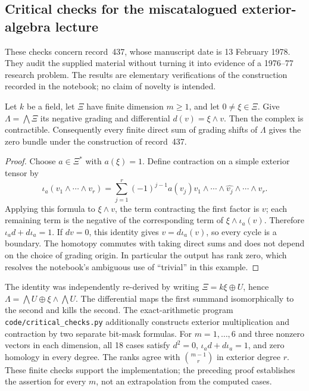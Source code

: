 \subsection{Critical checks for the miscatalogued exterior-algebra lecture}

These checks concern record~437, whose manuscript date is 13 February 1978.
They audit the supplied material without turning it into evidence of a
1976--77 research problem. The results are elementary verifications of the
construction recorded in the notebook; no claim of novelty is intended.

\begin{proposition}\ours{}
Let \(k\) be a field, let \(\Xi\) have finite dimension \(m\geq1\), and
let \(0\ne\xi\in\Xi\). Give \(\Lambda=\bigwedge\Xi\) its negative
grading and differential \(d(v)=\xi\wedge v\). Then the complex is
contractible. Consequently every finite direct sum of grading shifts of
\(\Lambda\) gives the zero bundle under the construction of record~437.
\end{proposition}
\begin{proof}
Choose \(a\in\Xi^*\) with \(a(\xi)=1\). Define contraction on a simple
exterior tensor by
\[
 \iota_a(v_1\wedge\cdots\wedge v_r)
 =\sum_{j=1}^r(-1)^{j-1}a(v_j)
 v_1\wedge\cdots\wedge\widehat{v_j}\wedge\cdots\wedge v_r.
\]
Applying this formula to \(\xi\wedge v\), the term contracting the first
factor is \(v\); each remaining term is the negative of the corresponding
term of \(\xi\wedge\iota_a(v)\). Therefore
\(\iota_a d+d\iota_a=1\). If \(dv=0\), this identity gives
\(v=d\iota_a(v)\), so every cycle is a boundary. The homotopy commutes
with taking direct sums and does not depend on the choice of grading
origin. In particular the output has rank zero, which resolves the
notebook's ambiguous use of ``trivial'' in this example.
\end{proof}

\begin{remark}\oursComputed{}
The identity was independently re-derived by writing
\(\Xi=k\xi\oplus U\), hence
\(\Lambda=\bigwedge U\oplus\xi\wedge\bigwedge U\). The differential
maps the first summand isomorphically to the second and kills the second.
The exact-arithmetic program \texttt{code/critical\_checks.py} additionally
constructs exterior multiplication and contraction by two separate
bit-mask formulas. For \(m=1,\ldots,6\) and three nonzero vectors in each
dimension, all 18 cases satisfy \(d^2=0\), \(\iota_a d+d\iota_a=1\),
and zero homology in every degree. The ranks agree with
\(\binom{m-1}{r}\) in exterior degree \(r\). These finite checks support
the implementation; the preceding proof establishes the assertion for
every \(m\), not an extrapolation from the computed cases.
\end{remark}

